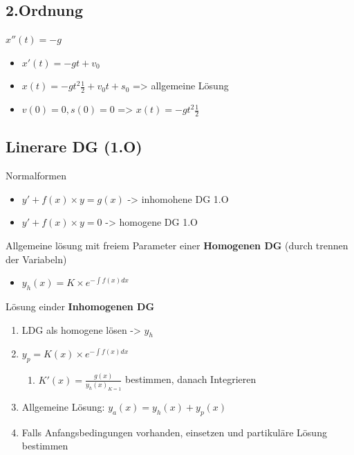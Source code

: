 \subsection*{2.Ordnung}

$x''(t)=-g$ 
\begin{itemize}
\item $x'(t)=-gt+v_{0}$
\item $x(t)=-gt^{2}\frac{1}{2}+v_{0}t+s_{0}$ => allgemeine Lösung
\item $v(0)=0,s(0)=0$ => $x(t)=-gt^{2}\frac{1}{2}$
\end{itemize}

\subsection*{Linerare DG (1.O)}

Normalformen
\begin{itemize}
\item $y'+f(x)\times y=g(x)$ -> inhomohene DG 1.O
\item $y'+f(x)\times y=0$ -> homogene DG 1.O
\end{itemize}
Allgemeine lösung mit freiem Parameter einer \textbf{Homogenen DG}
(durch trennen der Variabeln)
\begin{itemize}
\item $y_{h}(x)=K\times e^{-\int f(x)dx}$
\end{itemize}
Lösung einder \textbf{Inhomogenen DG}
\begin{enumerate}
\item LDG als homogene lösen -> $y_{h}$
\item $y_{p}=K(x)\times e^{-\int f(x)dx}$

\begin{enumerate}
\item $K'(x)=\frac{g(x)}{y_{h}(x)_{K=1}}$ bestimmen, danach Integrieren
\end{enumerate}
\item Allgemeine Lösung: $y_{a}(x)=y_{h}(x)+y_{p}(x)$ 
\item Falls Anfangsbedingungen vorhanden, einsetzen und partikuläre Lösung
bestimmen\end{enumerate}

